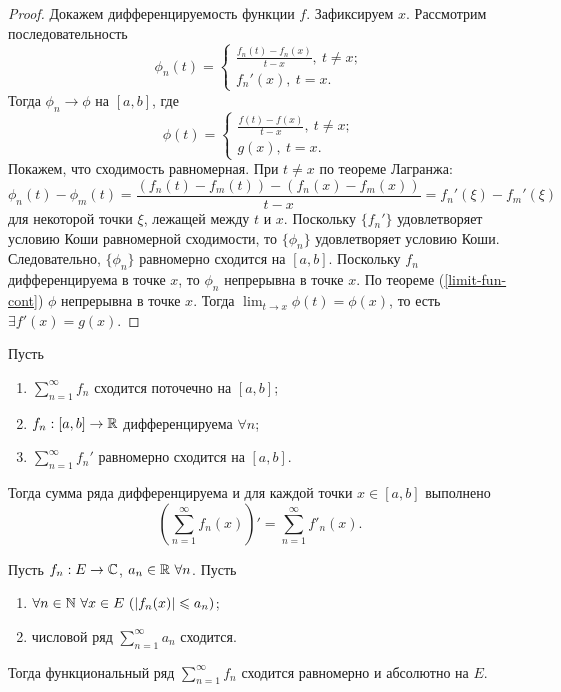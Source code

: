 \begin{proof}
    Докажем дифференцируемость функции $f$. Зафиксируем $x$. Рассмотрим последовательность
    \[
    \phi_{n}(t) = \begin{cases}
        \frac{f_{n}(t) - f_{n}(x)}{t - x}, \ t \neq x; \\
        f_{n}'(x), \ t = x.
    \end{cases}
    \]
    Тогда $\phi_{n} \to \phi$ на $[a, b]$, где
    \[\phi(t) = \begin{cases}
        \frac{f(t) - f(x)}{t - x}, \ t \neq x; \\
        g(x), \ t = x.
    \end{cases}\]
    Покажем, что сходимость равномерная. При $t \neq x$ по теореме Лагранжа:
    \[\phi_{n}(t) - \phi_{m}(t) = \frac{(f_{n}(t) - f_{m}(t)) - (f_{n}(x) - f_{m}(x))}{t - x} = f_{n}'(\xi) - f_{m}'(\xi)\]
    для некоторой точки $\xi$, лежащей между $t$ и $x$. Поскольку $\{f_{n}'\}$ удовлетворяет условию Коши равномерной сходимости, то $\{\phi_n\}$ удовлетворяет условию Коши.
    Следовательно, $\{\phi_n\}$ равномерно сходится на $[a, b]$.
    Поскольку $f_n$ дифференцируема в точке $x$, то $\phi_n$ непрерывна в точке $x$. По теореме (\ref{limit-fun-cont}) $\phi$ непрерывна в точке $x$. Тогда $\lim_{t \rightarrow x} \phi(t) = \phi(x)$, то есть $\exists f'(x) = g(x)$.
\end{proof}

\begin{corollary}
    Пусть
    \begin{enumerate}
        \item $\sum_{n = 1}^{\infty} f_{n}$ сходится поточечно на $[a, b]$;
        \item $f_{n}: [a, b] \to \mathbb{R}$ дифференцируема $\forall n$;
        \item $\sum_{n = 1}^{\infty} f_{n}'$ равномерно сходится на $[a, b]$.
    \end{enumerate}
    Тогда сумма ряда дифференцируема и для каждой точки $x \in [a, b]$ выполнено
    \[\left(\sum_{n = 1}^{\infty} f_{n}(x)\right)' = \sum_{n = 1}^{\infty} f'_{n}(x).\]
\end{corollary}

\begin{theorem}
    \label{convergence-3.5}
    Пусть $f_{n}: E \to \mathbb{C}$, $a_{n} \in \mathbb{R} \ \forall n$. Пусть
    \begin{enumerate}
        \item $\forall n \in \N \ \forall x \in E \ (|f_{n}(x)| \leq a_{n})$;
        \item числовой ряд $\sum_{n = 1}^{\infty}a_{n}$ сходится.
    \end{enumerate}
    Тогда функциональный ряд $\sum_{n = 1}^{\infty} f_{n}$ сходится равномерно и абсолютно на $E$.
\end{theorem}


